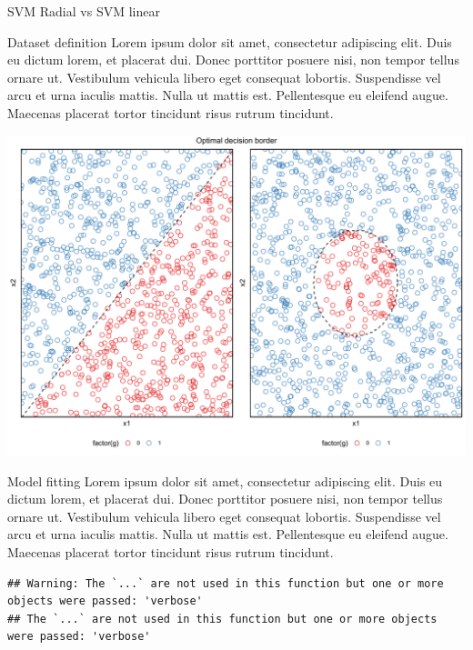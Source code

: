 \documentclass[
  ignorenonframetext,
]{article}
\begin{document}
\begin{frame}[fragile]{SVM Radial vs SVM linear}
\protect\hypertarget{svm-radial-vs-svm-linear}{}
\begin{block}{Dataset definition}
\protect\hypertarget{dataset-definition-4}{}
Lorem ipsum dolor sit amet, consectetur adipiscing elit. Duis eu dictum lorem, et placerat dui. Donec porttitor posuere nisi, non tempor tellus ornare ut. Vestibulum vehicula libero eget consequat lobortis. Suspendisse vel arcu et urna iaculis mattis. Nulla ut mattis est. Pellentesque eu eleifend augue. Maecenas placerat tortor tincidunt risus rutrum tincidunt.

\begin{center}\includegraphics{_main_files/figure-beamer/unnamed-chunk-65-1} \end{center}
\end{block}

\begin{block}{Model fitting}
\protect\hypertarget{model-fitting-4}{}
Lorem ipsum dolor sit amet, consectetur adipiscing elit. Duis eu dictum lorem, et placerat dui. Donec porttitor posuere nisi, non tempor tellus ornare ut. Vestibulum vehicula libero eget consequat lobortis. Suspendisse vel arcu et urna iaculis mattis. Nulla ut mattis est. Pellentesque eu eleifend augue. Maecenas placerat tortor tincidunt risus rutrum tincidunt.

\begin{verbatim}
## Warning: The `...` are not used in this function but one or more objects were passed: 'verbose'
## The `...` are not used in this function but one or more objects were passed: 'verbose'
\end{verbatim}


\end{block}
\end{frame}
\end{document}
